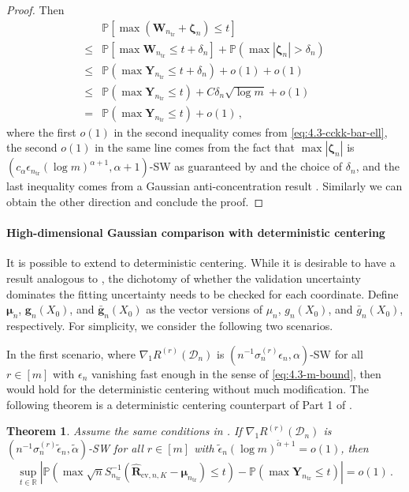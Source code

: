 \documentclass[11pt]{article}
\theoremstyle{plain}
\newtheorem{theorem}{Theorem}[section]
\newcommand{\cv}{{\mathrm{cv}}}
\newcommand{\tr}{{\mathrm{tr}}}
\newcommand{\D}{{\mathcal{D}}}
\begin{document}
\begin{proof}
Then
\begin{align*}
    &\mathbb P\left[\max(\mathbf W_{n_\tr}+\boldsymbol{\zeta}_n)\le t\right]\\
    \le & \mathbb P\left[\max\mathbf W_{n_\tr}\le t+\delta_n\right]+\mathbb P(\max|\boldsymbol{\zeta}_n|>\delta_n)\\
    \le & \mathbb P(\max \mathbf Y_{n_\tr}\le t+\delta_n)+o(1)+o(1)\\
    \le & \mathbb P(\max \mathbf Y_{n_\tr}\le t)+C\delta_n\sqrt{\log m}+o(1)\\
    = &\mathbb P(\max \mathbf Y_{n_\tr}\le t)+o(1)\,,
\end{align*}
where the first $o(1)$ in the second inequality comes from \eqref{eq:4.3-cckk-bar-ell}, the second $o(1)$ in the same line comes from the fact that $\max|\boldsymbol{\zeta}_n|$ is $(c_{\alpha}\epsilon_{n_\tr}(\log m)^{\alpha+1},\alpha+1)$-SW as guaranteed by  and the choice of $\delta_n$, and the last inequality comes from a Gaussian anti-concentration result \citep[Lemma J.3]{chernozhukov2022improved}.
Similarly we can obtain the other direction and conclude the proof.
\end{proof}


\paragraph{High-dimensional Gaussian comparison with deterministic centering}
It is possible to extend  to deterministic centering.  
While it is desirable to have a result analogous to , the dichotomy of whether the validation uncertainty dominates the fitting uncertainty needs to be checked for each coordinate.
Define $\boldsymbol{\mu}_n$, $\boldsymbol{g}_n(X_0)$, and $\bar{\boldsymbol{g}}_n(X_0)$ as the vector versions of $\mu_n$, $g_n(X_0)$, and $\bar g_n(X_0)$, respectively. 
For simplicity, we consider the following two scenarios. 

In the first scenario, where $\nabla_1 R^{(r)}(\D_n)$ is $(n^{-1}\sigma_n^{(r)}\epsilon_n,\alpha)$-SW for all $r\in[m]$ with $\epsilon_n$ vanishing fast enough in the sense of \eqref{eq:4.3-m-bound}, then  would hold for the deterministic centering without much modification.  The following theorem is a deterministic centering counterpart of Part 1 of .
\begin{theorem}\label{thm:4.3-hd-cv-clt-det-1}
    Assume the same conditions in . If $\nabla_1 R^{(r)}(\D_n)$ is $(n^{-1}\sigma_n^{(r)}\tilde\epsilon_n,\tilde\alpha)$-SW for all $r\in[m]$ with $\tilde\epsilon_n(\log m)^{\tilde\alpha+1}=o(1)$, then
        $$\sup_{t\in\mathbb R}\left|\mathbb P\left(\max \sqrt{n}S_{n_\tr}^{-1}(\hat{\mathbf R}_{\cv,n,K}-\boldsymbol{\mu}_{n_\tr})\le t\right) - \mathbb P(\max\mathbf Y_{n_\tr}\le t) \right|=o(1)\,.$$
\end{theorem}
\end{document}

